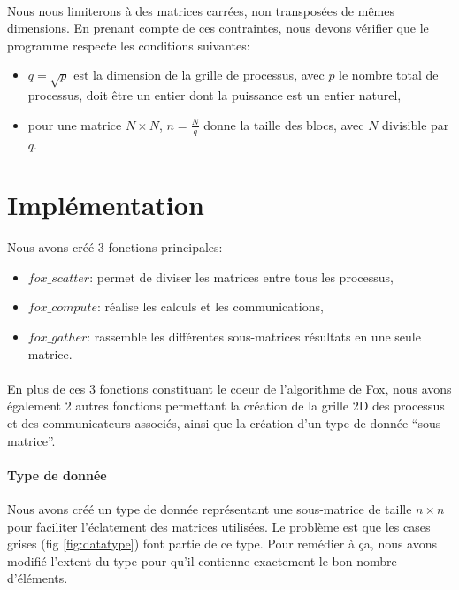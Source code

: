 \documentclass[12pt]{article}
\begin{document}
\paragraph{}Nous nous limiterons à des matrices carrées, non transposées de mêmes dimensions. En prenant compte de ces contraintes, nous devons vérifier que le programme respecte les conditions suivantes:
\begin{itemize}
\item $q=\sqrt{p}$ est la dimension de la grille de processus, avec $p$ le nombre total de processus, doit être un entier dont la puissance est un entier naturel,
\item pour une matrice $N \times N$, $n= \frac{N}{q} $ donne la taille des blocs, avec $N$ divisible par $q$.
\end{itemize}

\section{Implémentation} \label{s:impl}
Nous avons créé 3 fonctions principales:
\begin{itemize}
\item $fox\_scatter$: permet de diviser les matrices entre tous les processus,
\item $fox\_compute$: réalise les calculs et les communications,
\item $fox\_gather$: rassemble les différentes sous-matrices résultats en une seule matrice.
\end{itemize}

\paragraph{}
En plus de ces 3 fonctions constituant le coeur de l'algorithme de Fox, nous avons également 2 autres fonctions permettant la création de la grille 2D des processus et des communicateurs associés, ainsi que la création d'un type de donnée ``sous-matrice''.

\paragraph{Type de donnée}
Nous avons créé un type de donnée représentant une sous-matrice de taille $n\times n$ pour faciliter l'éclatement des matrices utilisées. Le problème est que les cases grises (fig \ref{fig:datatype}) font partie de ce type. Pour remédier à ça, nous avons modifié l'extent du type pour qu'il contienne exactement le bon nombre d'éléments. 
\end{document}
